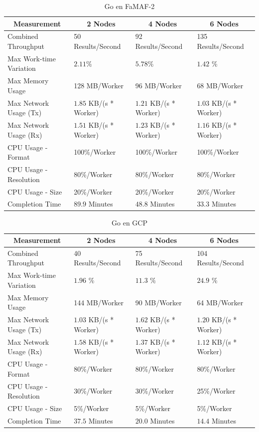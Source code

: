 \documentclass[11pt]{article}
\begin{document}
\begin{table}[H]
\centering
\begin{tabular}{|l|l|l|l|}
\hline
\multicolumn{1}{|c|}{Measurement} & \multicolumn{1}{c|}{2 Nodes} & \multicolumn{1}{c|}{4 Nodes} & \multicolumn{1}{c|}{6 Nodes} \\ \hline
Combined Throughput & 50 Results/Second & 92 Results/Second & 135 Results/Second \\ \hline
Max Work-time Variation & $2.11\%$& $5.78\%$& $1.42$ \% \\ \hline
Max Memory Usage & 128 MB/Worker & 96 MB/Worker & 68 MB/Worker \\ \hline
Max Network Usage (Tx) & $1.85$ KB/(s * Worker) & $1.21$ KB/(s * Worker) & $1.03$ KB/(s * Worker) \\ \hline
Max Network Usage (Rx) & $1.51$ KB/(s * Worker) & $1.23$ KB/(s * Worker) & $1.16$ KB/(s * Worker) \\ \hline
CPU Usage - Format & 100\%/Worker & 100\%/Worker & 100\%/Worker \\ \hline
CPU Usage - Resolution & 80\%/Worker & 80\%/Worker & 80\%/Worker \\ \hline
CPU Usage - Size & 20\%/Worker & 20\%/Worker & 20\%/Worker \\ \hline
Completion Time & $89.9$ Minutes & $48.8$ Minutes & $33.3$ Minutes \\ \hline
\end{tabular}
\caption{Go en FaMAF-2}
\end{table}

\begin{table}[H]
\centering
\begin{tabular}{|l|l|l|l|}
\hline
\multicolumn{1}{|c|}{Measurement} & \multicolumn{1}{c|}{2 Nodes} & \multicolumn{1}{c|}{4 Nodes} & \multicolumn{1}{c|}{6 Nodes} \\ \hline
Combined Throughput & 40 Results/Second & 75 Results/Second & 104 Results/Second \\ \hline
Max Work-time Variation & $1.96$ \% & $11.3$ \% & $24.9$ \% \\ \hline
Max Memory Usage & 144 MB/Worker & 90 MB/Worker & 64 MB/Worker \\ \hline
Max Network Usage (Tx) & $1.03$ KB/(s * Worker) & $1.62$ KB/(s * Worker) & $1.20$ KB/(s * Worker) \\ \hline
Max Network Usage (Rx) & $1.58$ KB/(s * Worker) & $1.37$ KB/(s * Worker) & $1.12$ KB/(s * Worker) \\ \hline
CPU Usage - Format & 80\%/Worker & 80\%/Worker & 80\%/Worker \\ \hline
CPU Usage - Resolution & 30\%/Worker & 30\%/Worker & 25\%/Worker \\ \hline
CPU Usage - Size & 5\%/Worker & 5\%/Worker & 5\%/Worker \\ \hline
Completion Time & $37.5$ Minutes & $20.0$ Minutes & $14.4$ Minutes \\ \hline
\end{tabular}
\caption{Go en GCP}
\end{table}
\end{document}

